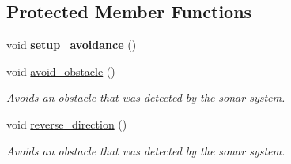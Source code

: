 \subsection*{Protected Member Functions}
\begin{DoxyCompactItemize}
\item 
\hypertarget{classSonar_ad40aca152adc93e6a4133b6068d4f2a7}{void {\bfseries setup\-\_\-avoidance} ()}\label{classSonar_ad40aca152adc93e6a4133b6068d4f2a7}

\item 
void \hyperlink{classSonar_a2aa24ef4c9041e0db87db2eab602346d}{avoid\-\_\-obstacle} ()
\begin{DoxyCompactList}\small\item\em Avoids an obstacle that was detected by the sonar system. \end{DoxyCompactList}\item 
void \hyperlink{classSonar_afbda79f1a96e294fb811f03f54a49a46}{reverse\-\_\-direction} ()
\begin{DoxyCompactList}\small\item\em Avoids an obstacle that was detected by the sonar system. \end{DoxyCompactList}\end{DoxyCompactItemize}
